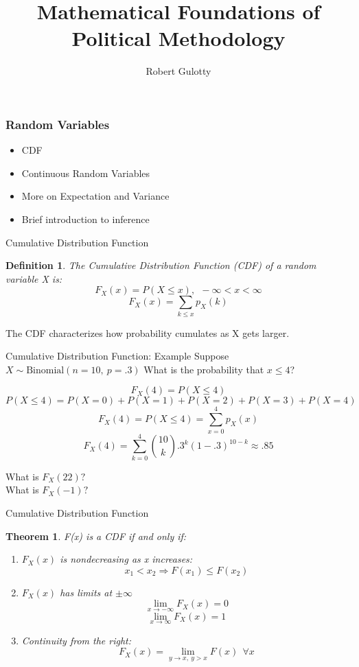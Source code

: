 \documentclass{beamer}
\title[PLSC 43401]{Mathematical Foundations of Political Methodology}
\author{Robert Gulotty}
\institute[Chicago]{University of Chicago}
\newtheorem{thm}{Theorem}
\newtheorem{defn}{Definition}
\numberwithin{equation}{section}
\begin{document}
\begin{frame}
\maketitle
\end{frame}


\begin{frame}
\frametitle{Random Variables}
\begin{itemize}
\item CDF
\item Continuous Random Variables
\item More on Expectation and Variance
\item Brief introduction to inference
\end{itemize}
\end{frame}


\begin{frame}{Cumulative Distribution Function}
\begin{defn}
The Cumulative Distribution Function (CDF) of a random variable X is:
$$F_X(x)=P(X\leq x),\ \ -\infty<x<\infty$$
$$F_X(x)=\sum_{k\leq x} p_X(k)$$
\end{defn}

The CDF characterizes how probability cumulates as X gets larger.
\end{frame}


\begin{frame}{Cumulative Distribution Function: Example}
Suppose $X\sim \text{Binomial}(n=10,\ p=.3)$
What is the probability that $x\leq 4$? 

$$F_X(4)=P(X\leq 4)$$\pause
$$P(X\leq 4)= P(X=0)+P(X=1)+P(X=2)+P(X=3) +P(X=4)$$\pause
$$F_X(4)=P(X\leq 4)= \sum_{x=0}^{4} p_X(x)$$\pause
$$F_X(4)=\sum_{k=0}^4{10\choose k} .3^k(1-.3)^{10-k}\approx .85$$\pause

What is $F_X(22)?$\\ \pause
What is $F_X(-1)?$
\end{frame}




\begin{frame}{Cumulative Distribution Function}

\begin{thm}
F(x) is a CDF if and only if:
\begin{enumerate}
\item  $F_X(x)$ is nondecreasing as x increases:
$$x_1<x_2\Rightarrow F(x_1)\leq F(x_2)$$
\item $F_X(x)$ has limits at $\pm \infty$ 
$$\lim_{x\rightarrow -\infty} F_X(x)=0$$
$$\lim_{x\rightarrow \infty} F_X(x)=1$$ 
\item Continuity from the right:
$$F_X(x)=\lim_{y\rightarrow x,\ y>x} F(x)\ \ \forall x$$
\end{enumerate}
\end{thm}
\end{frame}
\end{document}
